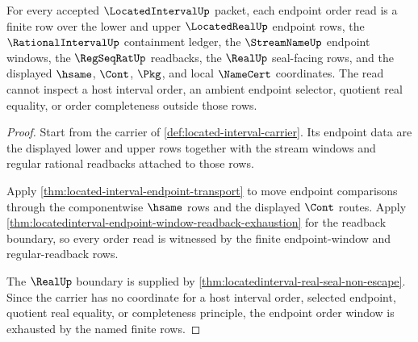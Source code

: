 \begin{theorem}
\label{thm:locatedinterval-endpoint-order-window}
For every accepted $\LocatedIntervalUp$ packet, each endpoint order read is a finite row over the lower and upper $\LocatedRealUp$ endpoint rows, the $\RationalIntervalUp$ containment ledger, the $\StreamNameUp$ endpoint windows, the $\RegSeqRatUp$ readbacks, the $\RealUp$ seal-facing rows, and the displayed $\hsame$, $\Cont$, $\Pkg$, and local $\NameCert$ coordinates. The read cannot inspect a host interval order, an ambient endpoint selector, quotient real equality, or order completeness outside those rows.
\end{theorem}
\begin{proof}
Start from the carrier of \autoref{def:located-interval-carrier}. Its endpoint data are the displayed lower and upper rows together with the stream windows and regular rational readbacks attached to those rows.

Apply \autoref{thm:located-interval-endpoint-transport} to move endpoint comparisons through the componentwise $\hsame$ rows and the displayed $\Cont$ routes. Apply \autoref{thm:locatedinterval-endpoint-window-readback-exhaustion} for the readback boundary, so every order read is witnessed by the finite endpoint-window and regular-readback rows.

The $\RealUp$ boundary is supplied by \autoref{thm:locatedinterval-real-seal-non-escape}. Since the carrier has no coordinate for a host interval order, selected endpoint, quotient real equality, or completeness principle, the endpoint order window is exhausted by the named finite rows.
\end{proof}

